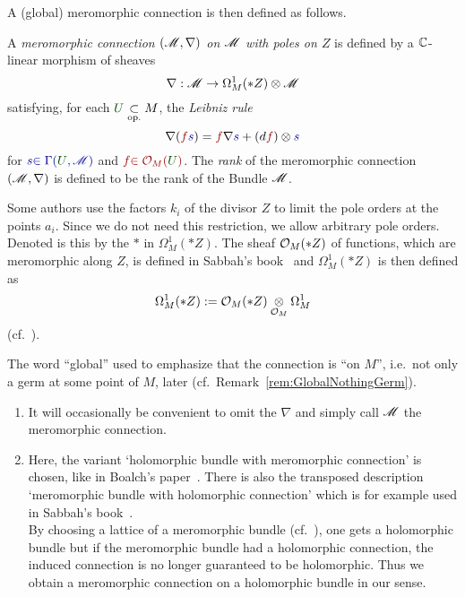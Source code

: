A (global) meromorphic connection is then defined as follows.
\begin{defn}\label{defn:mercon}
  \def\myU{\textcolor{green!30!black}{U}}
  \def\mys{\textcolor{blue!60!black}{s}}
  \def\myf{\textcolor{red!60!black}{f}}
  A \emph{meromorphic connection $(\mathscr{M},\nabla)$ on $\mathscr{M}$ with poles on $Z$}
  is defined by a $\mathbb{C}$-linear morphism of sheaves
  \[
    \nabla:\mathscr{M}\to\Omega_M^1(*Z)\otimes\mathscr{M}
  \]
  satisfying, for each $\myU\underset{\text{op.}}{\subset} M$, the
  \emph{Leibniz rule}
    \[
      \nabla(\myf\mys)=\myf\nabla\mys+(d\myf)\otimes\mys
    \]
  for $\mys\textcolor{blue!60!black}{\in\Gamma(\myU,\sM)}$ and
  $\myf\textcolor{red!60!black}{\in\cO_M(\myU)}$.
  The \emph{rank} of the meromorphic connection $(\mathscr{M},\nabla)$ is defined to be
  the rank of the Bundle $\mathscr{M}$.
  \begin{s-rem}
    Some authors use the factors $k_i$ of the divisor $Z$ to limit the pole
    orders at the points $a_i$. Since we do not need this restriction, we allow
    arbitrary pole orders. Denoted is this by the $*$ in $\Omega_M^1(*Z)$.
    The sheaf $\mathcal{O}_M(*Z)$ of functions, which are meromorphic along $Z$, is
    defined in Sabbah's book~\cite[Sec.0.8]{sabbah2007isomonodromic} and
    $\Omega_M^1(*Z)$ is then defined as
    \[
      \Omega_M^1(*Z):=\mathcal{O}_M(*Z)\underset{\mathcal{O}_M}\otimes\Omega_M^1
    \]
     (cf.\
    \cite[Sec.0.9.b]{sabbah2007isomonodromic}).
  \end{s-rem}
\end{defn}
The word ``global'' used to emphasize that the connection is ``on $M$'', i.e.\
not only a germ at some point of $M$,  later
(cf.\ Remark~\ref{rem:GlobalNothingGerm}).
\begin{rem}
  \begin{enumerate}
    \item It will occasionally be convenient to omit the $\nabla$ and simply
      call $\mathscr{M}$ the meromorphic connection.
    \item Here, the variant `holomorphic bundle with meromorphic connection' is
      chosen, like in Boalch's paper~\cite{boalch}.
      There is also the transposed description `meromorphic bundle with
      holomorphic connection' which is for example used in Sabbah's
      book~\cite{sabbah2007isomonodromic}.
      \\By choosing a lattice of a meromorphic bundle (cf.\
      \cite[Def.0.8.3]{sabbah2007isomonodromic}), one gets a holomorphic bundle
      but if the meromorphic bundle had a holomorphic connection, the induced
      connection \rewrite{on the lattice} is no longer guaranteed to be
      holomorphic.
      Thus we obtain a meromorphic connection on a holomorphic bundle in our
      sense.
  \end{enumerate}
\end{rem}

